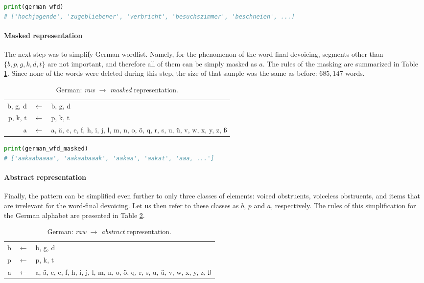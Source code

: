\begin{lstlisting}[language=Python]
print(german_wfd)
# ['hochjagende', 'zugebliebener', 'verbricht', 'besuchszimmer', 'beschneien', ...]
\end{lstlisting}


\paragraph{Masked representation}

The next step was to simplify German wordlist.
Namely, for the phenomenon of the word-final devoicing, segments other than $\{b, p, g, k, d, t\}$ are not important, and therefore all of them can be simply masked as $a$.
The rules of the masking are summarized in Table \ref{germanmap1}.
Since none of the words were deleted during this step, the size of that sample was the same as before: $685,147$ words.

\begin{table}[h!]
\begin{center}
\begin{tabular}{rcl}
b, g, d & $\leftarrow$ & b, g, d \\
p, k, t & $\leftarrow$ & p, k, t \\
a & $\leftarrow$ & a, \"a, c, e, f, h, i, j, l, m, n, o, \"o, q, r, s, u, \"u, v, w, x, y, z, \ss
\end{tabular}
\end{center}
\caption{German: \emph{raw} $\rightarrow$ \emph{masked} representation.}
\label{germanmap1}
\end{table}

\begin{lstlisting}[language=Python]
print(german_wfd_masked)
# ['aakaabaaaa', 'aakaabaaak', 'aakaa', 'aakat', 'aaa, ...']
\end{lstlisting}

\paragraph{Abstract representation}

Finally, the pattern can be simplified even further to only three classes of elements: voiced obstruents, voiceless obstruents, and items that are irrelevant for the word-final devoicing.
Let us then refer to these classes as $b$, $p$ and $a$, respectively.
The rules of this simplification for the German alphabet are presented in Table \ref{germanmap2}.

\begin{table}[h!]
\begin{center}
\begin{tabular}{rcl}
b & $\leftarrow$ & b, g, d \\
p & $\leftarrow$ & p, k, t \\
a & $\leftarrow$ & a, \"a, c, e, f, h, i, j, l, m, n, o, \"o, q, r, s, u, \"u, v, w, x, y, z, \ss
\end{tabular}
\end{center}
\caption{German: \emph{raw} $\rightarrow$ \emph{abstract} representation.}
\label{germanmap2}
\end{table}

